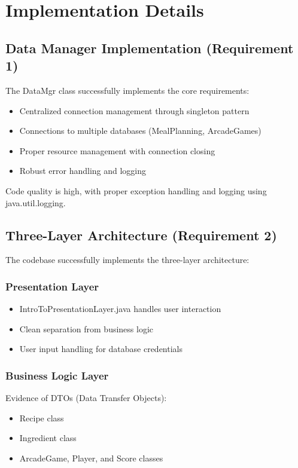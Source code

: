 \documentclass[12pt]{article}
\begin{document}
\section{Implementation Details}

\subsection{Data Manager Implementation (Requirement 1)}
The DataMgr class successfully implements the core requirements:
\begin{itemize}
    \item Centralized connection management through singleton pattern
    \item Connections to multiple databases (MealPlanning, ArcadeGames)
    \item Proper resource management with connection closing
    \item Robust error handling and logging
\end{itemize}

Code quality is high, with proper exception handling and logging using
java.util.logging.

\subsection{Three-Layer Architecture (Requirement 2)}
The codebase successfully implements the three-layer architecture:

\subsubsection{Presentation Layer}
\begin{itemize}
    \item IntroToPresentationLayer.java handles user interaction
    \item Clean separation from business logic
    \item User input handling for database credentials
\end{itemize}

\subsubsection{Business Logic Layer}
Evidence of DTOs (Data Transfer Objects):
\begin{itemize}
    \item Recipe class
    \item Ingredient class
    \item ArcadeGame, Player, and Score classes
\end{itemize}
\end{document}
